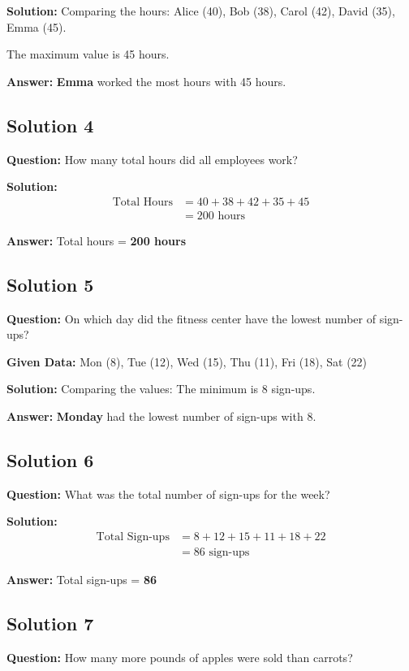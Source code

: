 \documentclass[12pt,a4paper]{article}
\begin{document}
\textbf{Solution:} Comparing the hours: Alice (40), Bob (38), Carol (42), David (35), Emma (45).

The maximum value is 45 hours.

\textbf{Answer:} \textbf{Emma} worked the most hours with 45 hours.

\subsection*{Solution 4}
\textbf{Question:} How many total hours did all employees work?

\textbf{Solution:}
\begin{align*}
\text{Total Hours} &= 40 + 38 + 42 + 35 + 45 \\
&= 200 \text{ hours}
\end{align*}

\textbf{Answer:} Total hours = \textbf{200 hours}

\subsection*{Solution 5}
\textbf{Question:} On which day did the fitness center have the lowest number of sign-ups?

\textbf{Given Data:} Mon (8), Tue (12), Wed (15), Thu (11), Fri (18), Sat (22)

\textbf{Solution:} Comparing the values: The minimum is 8 sign-ups.

\textbf{Answer:} \textbf{Monday} had the lowest number of sign-ups with 8.

\subsection*{Solution 6}
\textbf{Question:} What was the total number of sign-ups for the week?

\textbf{Solution:}
\begin{align*}
\text{Total Sign-ups} &= 8 + 12 + 15 + 11 + 18 + 22 \\
&= 86 \text{ sign-ups}
\end{align*}

\textbf{Answer:} Total sign-ups = \textbf{86}

\subsection*{Solution 7}
\textbf{Question:} How many more pounds of apples were sold than carrots?
\end{document}
